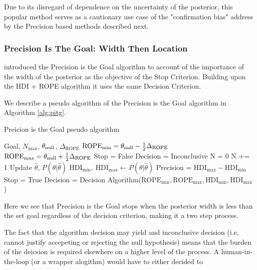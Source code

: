 Due to its disregard of dependence on the uncertainty of the posterior,
this popular method serves as a cautionary use case of the "confirmation bias"
address by the Precision based methods described next.


\subsubsection{Precision Is The Goal: Width Then Location}

\cite{kruschke2015doing} introduced the Precision is the Goal algorithm to account
of the importance of the width of the posterior as the objective of the Stop Criterion.
Building upon the HDI + ROPE algorithm it uses the same Decision Criterion.

We describe a pseudo algorithm of the Precision is the Goal algorithm in Algorithm \ref{alg:pitg}.

\begin{algorithm}
    \caption{Preicion is the Goal pseudo algorithm}\label{alg:pitg}
    \begin{algorithmic}
    \Require Goal, $N_\mathrm{max}$, $\theta_{\rm null}$, $\Delta_\mathrm{ROPE}$
    \State $\mathrm{ROPE}_\mathrm{min} = \theta_{\rm null} - \frac{1}{2}\Delta_\mathrm{ROPE}$
    \State $\mathrm{ROPE}_\mathrm{max} = \theta_{\rm null} + \frac{1}{2}\Delta_\mathrm{ROPE}$
    \State Stop = False
    \State Decision = Inconclusive
    \State N = 0
    \State N += 1  
    \State Update $\hat\theta$, $P(\theta|\hat\theta)$  
    \State $\mathrm{HDI}_\mathrm{min}, \ \mathrm{HDI}_\mathrm{max}  \gets P(\theta|\hat\theta)$
    \State Precision = $\mathrm{HDI}_\mathrm{max} - \mathrm{HDI}_\mathrm{min}$
         \State \HiLi Stop = True 
         \State Decision = Decision Algorithm($\mathrm{ROPE}_\mathrm{min}, \mathrm{ROPE}_\mathrm{max}, \mathrm{HDI}_\mathrm{min}, \mathrm{HDI}_\mathrm{max}$)  
    \EndIf
    \EndWhile
    \end{algorithmic}
\end{algorithm}

Here we see that Precision is the Goal stops when the posterior width is less than
the set goal regardless of the decision criterion, making it a two step process.

The fact that the algorithm decision may yield and inconclusive decision
(i.e, cannot justify accepeting or rejecting the null hypothesis) means that the
burden of the deicsion is required elsewhere on a higher level of the process.
A human-in-the-loop (or a wrapper alogithm) would have to either decided to

